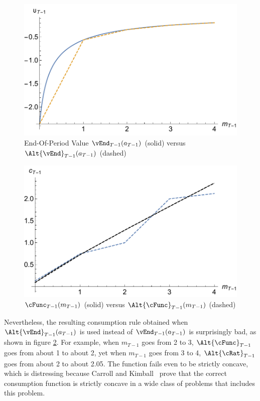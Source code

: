 \documentclass[titlepage]{\econtex}
\begin{document}
\hypertarget{PlotOTm1RawVSInt}{}
\begin{figure}
        \includegraphics{./Figures/PlotOTm1RawVSInt}
        \caption{End-Of-Period Value $\vEnd_{T-1}({a}_{T-1})$ (solid) versus $\Alt{\vEnd}_{T-1}({a}_{T-1})$ (dashed)}
        \label{fig:PlotOTm1RawVSInt}
\end{figure}

\hypertarget{PlotComparecTm1AB}{}
\begin{figure}
        \includegraphics{./Figures/PlotComparecTm1AB}
        \caption{$\cFunc_{T-1}({m}_{T-1})$ (solid) versus $\Alt{\cFunc}_{T-1}({m}_{T-1})$ (dashed)}
        \label{fig:PlotComparecTm1AB}
\end{figure}

Nevertheless, the resulting consumption rule obtained when $\Alt{\vEnd}_{T-1}({a}_{T-1})$
 is used
instead of $\vEnd_{T-1}({a}_{T-1})$ is surprisingly bad, as
shown in figure \ref{fig:PlotComparecTm1AB}.  For example, when
${m}_{T-1}$ goes from 2 to 3, $\Alt{\cFunc}_{T-1}$ goes from about 1
to about 2, yet when ${m}_{T-1}$ goes from 3 to 4, $\Alt{\cRat}_{T-1}$
goes from about 2 to about 2.05.  The function fails even to be
strictly concave, which is distressing because Carroll and
Kimball~\citeyearpar{carroll&kimball:concavity} prove that the correct
consumption function is strictly concave in a wide class of problems that
includes this problem.
\end{document}

